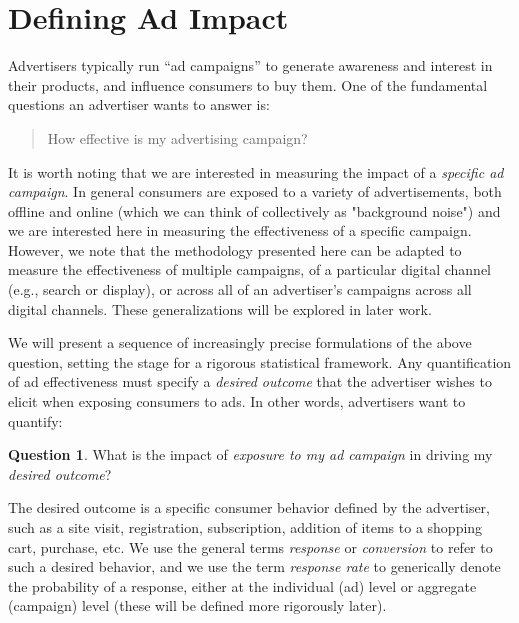 \documentclass[11pt,a4paper]{article}
\theoremstyle{definition}
\theoremstyle{remark}
\theoremstyle{definition}
\theoremstyle{definition}
\theoremstyle{definition}
\newtheorem{question}{Question}[section]
\theoremstyle{definition}
\theoremstyle{definition}
\theoremstyle{definition}
\begin{document}

\section{Defining Ad Impact} \label{sec-define}

Advertisers typically run “ad campaigns” to generate awareness and interest in their products, and influence consumers to buy them. One of the fundamental questions an advertiser wants to answer is: 
\begin{quote}
How effective is my advertising campaign?	
\end{quote}


It is worth noting that we are interested in measuring the impact of a \textit{specific ad campaign}. In general consumers are exposed to a variety of advertisements, both offline and online (which we can think of collectively as "background noise") and we are interested here in measuring the effectiveness of a specific campaign. However, we note that the methodology presented here can be adapted to measure the effectiveness of multiple campaigns, of a particular digital channel (e.g., search or display), or across all of an advertiser’s campaigns across all digital channels. These generalizations will be explored in later work. 

We will present a sequence of increasingly precise formulations of the above question, setting the stage for a rigorous statistical framework. 
Any quantification of ad effectiveness must specify a {\em desired outcome} that the advertiser wishes to elicit when exposing consumers to ads. In other words, advertisers want to quantify:

\begin{question}
What is the impact of {\em exposure to my ad campaign} in driving my {\em desired outcome}? 	
\end{question}



 
The desired outcome is a specific consumer behavior defined by the advertiser, such as a site visit, registration, subscription, addition of items to a shopping cart, purchase, etc. We use the general terms {\em response} or {\em conversion} to refer to such a desired behavior, and we use the term  {\em response rate} to generically denote the probability of a response, either at the individual (ad) level or aggregate (campaign) level (these will be defined more rigorously later).
\end{document}
